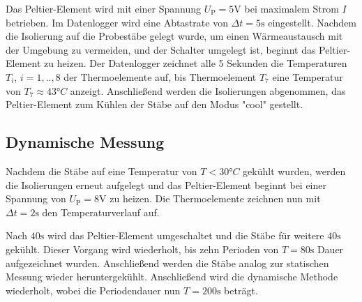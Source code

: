 Das Peltier-Element wird mit einer Spannung $U_\mathup{P}=5 \si{\volt}$ bei maximalem Strom $I$ betrieben. 
Im Datenlogger wird eine Abtastrate von $\Delta{t}=5\si{\second}$ eingestellt. 
Nachdem die Isolierung auf die Probestäbe gelegt wurde, um einen Wärmeaustausch mit der Umgebung zu vermeiden, und der Schalter umgelegt ist, beginnt das Peltier-Element zu heizen. 
Der Datenlogger zeichnet alle 5 Sekunden die Temperaturen $T_i$, $i=1,..,8$ der Thermoelemente auf, bis Thermoelement $T_7$ eine Temperatur von $T_\mathup{7}\approx 43°C$ anzeigt. 
Anschließend werden die Isolierungen abgenommen, das Peltier-Element zum Kühlen der Stäbe auf den Modus "cool" gestellt.

\subsection{Dynamische Messung}
Nachdem die Stäbe auf eine Temperatur von $T<30°C$ gekühlt wurden, werden die Isolierungen erneut aufgelegt und das Peltier-Element beginnt bei einer Spannung von $U_\mathup{P}=8 \si{\volt}$ zu heizen. Die Thermoelemente zeichnen nun mit $\Delta{t}=2\si{\second}$ den Temperaturverlauf auf.

Nach $40\si\second$ wird das Peltier-Element umgeschaltet und die Stäbe für weitere $40\si\second$ gekühlt. 
Dieser Vorgang wird wiederholt, bis zehn Perioden von $T=80\si\second$ Dauer aufgezeichnet wurden. 
Anschließend werden die Stäbe analog zur statischen Messung wieder heruntergekühlt. 
Anschließend wird die dynamische Methode wiederholt, wobei die Periodendauer nun $T=200\si\second$ beträgt. 
